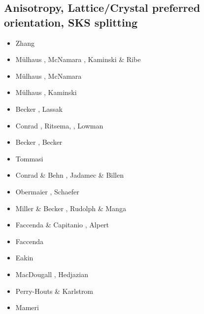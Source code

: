 \subsection{Anisotropy, Lattice/Crystal preferred orientation, SKS splitting}
\label{sec:topics:anisotropy}

\begin{scriptsize}
\begin{itemize}
\item[\nineteeneightythree] Zhang \etal \cite{zhhj93}
\item[\twothousandtwo] M\"ulhaus \etal \cite{mudm02}, McNamara \etal \cite{mcvk02}, 
                       Kaminski \& Ribe \cite{kari02}
\item[\twothousandthree] M\"ulhaus \etal \cite{mumc03}, McNamara \etal \cite{mcvk03}
\item[\twothousandfour] M\"ulhaus \etal \cite{mumc04}, Kaminski \etal \cite{karb04}
\item[\twothousandsix] Becker \etal \cite{besb06}, Lassak \etal \cite{lafh06}
\item[\twothousandseven] Conrad \etal \cite{cobs07}, Ritsema, \etal \cite{rimb07}, Lowman \etal \cite{lopk07}
\item[\twothousandeight] Becker \etal \cite{beke08}, Becker \cite{beck08}
\item[\twothousandnine] Tommasi \etal \cite{tokv09}
\item[\twothousandten] Conrad \& Behn \cite{cobe10}, Jadamec \& Billen \cite{jabi10a}
\item[\twothousandeleven] Obermaier \etal \cite{obbh11}, Schaefer \etal \cite{scbb11}
\item[\twothousandtwelve] Miller \& Becker \cite{mibe12}, Rudolph \& Manga \cite{ruma12}
\item[\twothousandthirteen] Faccenda \& Capitanio \cite{faca13}, Alpert \etal \cite{almb13}
\item[\twothousandfourteen] Faccenda \cite{facc14}
\item[\twothousandfifteen] Eakin \etal \cite{ealw15}
\item[\twothousandseventeen] MacDougall \etal \cite{majf17}, Hedjazian \etal \cite{hegd17}
\item[\twothousandeighteen] Perry-Houts \& Karlstrom \cite{peka18}
\item[\twothousandnineteen] Mameri \etal \cite{mats19}
\end{itemize}
\end{scriptsize}

